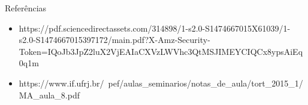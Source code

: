 \documentclass{beamer}
\begin{document}
\begin{frame}[t]{Referências}
\begin{itemize}
        \item https://pdf.sciencedirectassets.com/314898/1-s2.0-S1474667015X61039/1-s2.0-S1474667015397172/main.pdf?X-Amz-Security-Token=IQoJb3JpZ2luX2VjEAIaCXVzLWVhc3QtMSJIMEYCIQCx8ypsAiEq0q1m%
        \item https://www.if.ufrj.br/~pef/aulas_seminarios/notas_de_aula/tort_2015_1/MA_aula_8.pdf
    \end{itemize}
\end{frame}
\end{document}
